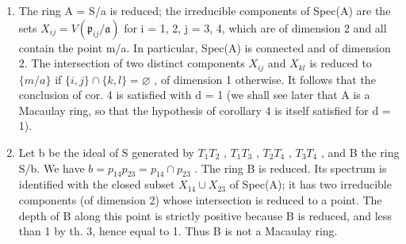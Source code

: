 \begin{enumerate}
\def\labelenumi{\alph{enumi})}
\item
  The ring A = S/a is reduced; the irreducible components of Spec(A) are the sets \(X_{ij} = V(\mathfrak{p}_{ij}/\mathfrak{a})\) for i = 1, 2, j = 3, 4, which are of dimension 2 and all contain the point m/a. In particular, Spec(A) is connected and of dimension 2. The intersection of two distinct components \(X_{ij}\) and \(X_{kl}\) is reduced to \(\{m/a\}\) if \(\{i,j\} \cap \{k,l\} = \varnothing\) , of dimension 1 otherwise. It follows that the conclusion of cor. 4 is satisfied with d = 1 (we shall see later that A is a Macaulay ring, so that the hypothesis of corollary 4 is itself satisfied for d = 1).
\item
  Let b be the ideal of S generated by \(T_{1}T_{2}\) , \(T_{1}T_{3}\) , \(T_{2}T_{4}\) , \(T_{3}T_{4}\) , and B the ring S/b. We have \(b = p_{14}p_{23} = p_{14} \cap p_{23}\) . The ring B is reduced. Its spectrum is identified with the closed subset \(X_{14} \cup X_{23}\) of Spec(A); it has two irreducible components (of dimension 2) whose intersection is reduced to a point. The depth of B along this point is strictly positive because B is reduced, and less than 1 by th. 3, hence equal to 1. Thus B is not a Macaulay ring.
\end{enumerate}

